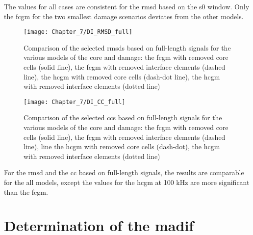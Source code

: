 \documentclass[11pt,a4paper,final]{report}
\theoremstyle{plain}
\begin{document}
The values for all cases are consistent for the \ac{rmsd} based on the \ac{s0} window.
Only the \ac{fcgm} for the two smallest damage scenarios deviates from the other models.
\begin{figure}[!tbh]
	\begin{center}
		\texttt{[image: Chapter\_7/DI\_RMSD\_full]}
	\end{center}
	\caption{Comparison of the selected \acfp{rmsd} based on full-length signals for the various models of the core and damage: the \acf{fcgm} with removed core cells (solid line), the \acf{fcgm} with removed interface elements (dashed line), the \acf{hcgm} with removed core cells (dash-dot line), the \acf{hcgm} with removed interface elements (dotted line)}
	\label{fig:DI_RMSD_full}
\end{figure}

\begin{figure}[!tbh]
	\begin{center}
		\texttt{[image: Chapter\_7/DI\_CC\_full]}
	\end{center}
	\caption{Comparison of the selected \acfp{cc} based on full-length signals for the various models of the core and damage: the \acf{fcgm} with removed core cells (solid line), the \acf{fcgm} with removed interface elements (dashed line), line the \acf{hcgm} with removed core cells (dash-dot), the \acf{hcgm} with removed interface elements (dotted line)}
	\label{fig:DI_CC}
\end{figure}

For the \ac{rmsd} and the \ac{cc} based on full-length signals, the results are comparable for the all models, except the values for the \ac{hcgm} at 100 \unit{kHz} are more significant than the \ac{fcgm}.
 \section{Determination of the \acl{madif}}
\label{sec:determination}
\end{document}
